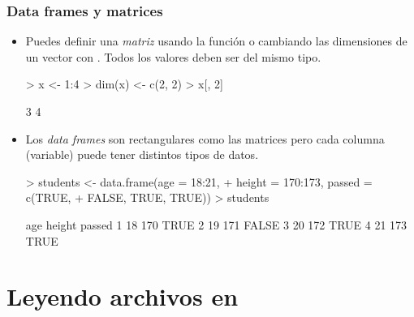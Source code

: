 \begin{frame}
  \frametitle{Data frames y matrices}
  \begin{itemize}
  \item Puedes definir una \emph{matriz} usando la funci\'on  o cambiando las dimensiones de un vector con . Todos los valores deben ser del mismo tipo.
\begin{Schunk}
\begin{Sinput}
> x <- 1:4
> dim(x) <- c(2, 2)
> x[, 2]
\end{Sinput}
\begin{Soutput}
[1] 3 4
\end{Soutput}
\end{Schunk}
  \item Los \emph{data frames} son rectangulares como las matrices pero cada columna (variable) puede tener distintos tipos de datos.
\begin{Schunk}
\begin{Sinput}
> students <- data.frame(age = 18:21, 
+     height = 170:173, passed = c(TRUE, 
+         FALSE, TRUE, TRUE))
> students
\end{Sinput}
\begin{Soutput}
  age height passed
1  18    170   TRUE
2  19    171  FALSE
3  20    172   TRUE
4  21    173   TRUE
\end{Soutput}
\end{Schunk}
  \end{itemize}
\end{frame}


\section{Leyendo archivos en }


